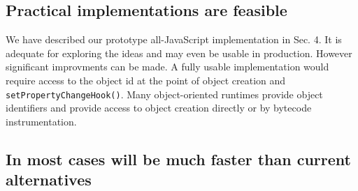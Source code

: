 \documentclass{sig-alternate}
\begin{document}



\subsection{Practical implementations are feasible}

We have described our prototype all-JavaScript implementation in Sec. 4. It is adequate for 
exploring the ideas and may even be usable in production. However significant 
improvments can be made. A fully usable
implementation would require access to the object id at the point of
object creation and \texttt{setPropertyChangeHook()}. Many
object-oriented runtimes provide object identifiers and 
provide access to object creation directly or by bytecode instrumentation\cite{JPDA}. 

\subsection{In most cases  will be much faster than current alternatives}

\end{document}
